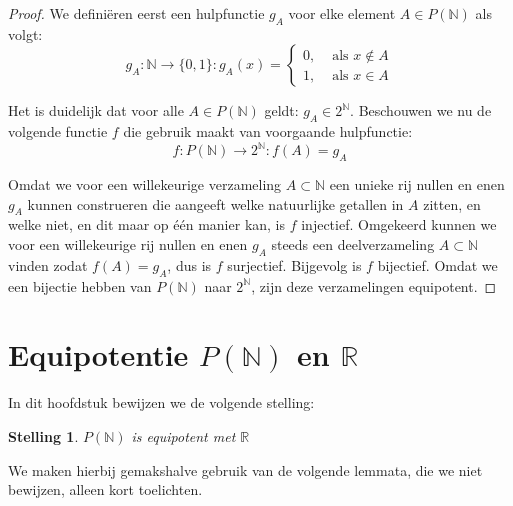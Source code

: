 \documentclass[hidelinks,11pt,a4paper]{article}
\newtheorem{stelling}{Stelling}
\begin{document}
\begin{proof}
We defini\"eren eerst een hulpfunctie $g_A$ voor elke element $A \in P(\mathbb{N})$ als volgt: 
\begin{equation}
  g_A: \mathbb{N} \rightarrow \{0,1\}: 
  g_A(x) = \left\{  
  \begin{aligned}
  0, &\text{ als } x \notin A \\
  1, &\text{ als } x \in A
  \end{aligned}
  \right.
\end{equation}

Het is duidelijk dat voor alle $A\in P(\mathbb{N})$ geldt: $g_A \in 2^{\mathbb{N}}$. 
Beschouwen we nu de volgende functie $f$ die gebruik maakt van voorgaande hulpfunctie: 
\begin{equation}
\label{fun_nat2_binstring}
f: P(\mathbb{N}) \rightarrow  2^{\mathbb{N}}: f(A) = g_A 
\end{equation}

Omdat we voor een willekeurige verzameling $A \subset \mathbb{N}$ een unieke rij nullen en enen $g_A$ kunnen construeren die aangeeft welke natuurlijke getallen in $A$ zitten, en welke niet, en dit maar op \'e\'en manier kan, is $f$ injectief. 
Omgekeerd kunnen we voor een willekeurige rij nullen en enen $g_A$ steeds een deelverzameling $A \subset \mathbb{N}$ vinden zodat $f(A)=g_A$, dus is $f$ surjectief. Bijgevolg is $f$ bijectief. 
Omdat we een bijectie hebben van $P(\mathbb{N})$ naar $2^{\mathbb{N}}$, zijn deze verzamelingen equipotent. 
\end{proof}

\section{Equipotentie \texorpdfstring{$P(\mathbb{N})$}{} en \texorpdfstring{$\mathbb{R}$}{}}

In dit hoofdstuk bewijzen we de volgende stelling: 
\begin{stelling}
\label{st_bonus}
$P(\mathbb{N})$ is equipotent met $\mathbb{R}$ 
\end{stelling}

We maken hierbij gemakshalve gebruik van de volgende lemmata, die we niet bewijzen, alleen kort toelichten.  
\end{document}
